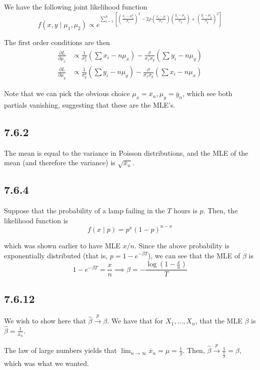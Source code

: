 \documentclass[12pt,letterpaper]{article}
\theoremstyle{definition}
\begin{document}
We have the following joint likelihood function
\[
  f(x, y \mid \mu_1, \mu_2) \propto e^{\sum_{i=1}^n[(\frac{x_i -
      \mu_x^2}{\sigma_i})^2 - 2\rho (\frac{x_i -
      \mu}{\sigma_x})(\frac{y_i-\mu_y}{\sigma_y}) + (\frac{y_i - \mu_y}{\sigma_y})^2]}
\]

The first order conditions are then
\begin{align*}
  \frac{\partial L}{\partial \mu_x} &\propto \frac{1}{\sigma_x^2}\left( \sum x_i - n\mu_x \right) - \frac{\rho}{\sigma_x\sigma_y}\left( \sum y_i - n\mu_y \right) \\
  \frac{\partial L}{\partial \mu_y} &\propto \frac{1}{\sigma_y^2}\left( \sum y_i - n\mu_y \right) - \frac{\rho}{\sigma_x\sigma_y}\left( \sum x_i - n\mu_x \right)
\end{align*}

Note that we can pick the obvious choice $\mu_x = \overline{x}_n, \mu_y =
\overline{y}_n$, which see both partials vanishing, suggesting that these are
the MLE's.

\subsection*{7.6.2}

The mean is equal to the variance in Poisson distributions, and the MLE of the
mean (and therefore the variance) is $\sqrt{\overline{x}_n}$.

\subsection*{7.6.4}

Suppose that the probability of a lamp failing in the $T$ hours is $p$. Then,
the likelihood function is
\[
  f(x \mid p) = p^x(1-p)^{n-x}
\]

which was shown earlier to have MLE $x/n$. Since the above probability is
exponentially distributed (that is, $p = 1 - e^{- \beta T}$), we can see that
the MLE of $\beta$ is
\[
  1 - e^{-\beta T} = \frac{x}{n} \implies \beta = -\frac{\log(1 - \frac{x}{n})}{T}
\]


\subsection*{7.6.12}

We wish to show here that $\hat{\beta} \xrightarrow{p}{} \beta$. We have that
for $X_1, \dots, X_n$, that the MLE $\beta$ is $\hat{\beta} =
\frac{1}{\overline{x}_n}$.

The law of large numbers yields that $\lim_{n\rightarrow \infty}\overline{x}_n =
\mu = \frac{1}{\beta}$. Then, $\hat{\beta} \xrightarrow{p}{}
\frac{1}{\frac{1}{\beta}} = \beta$, which was what we wanted.
\end{document}

